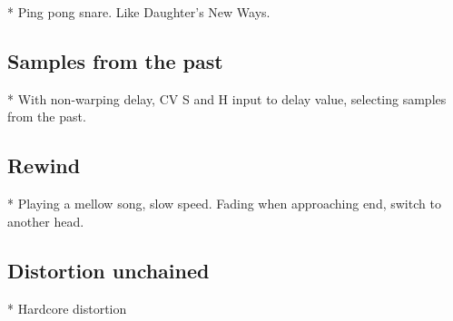 \documentclass[11pt]{article}
\begin{document}
* Ping pong snare. Like Daughter's New Ways.

\subsection{Samples from the past}

* With non-warping delay, CV S and H input to delay value, selecting samples from
  the past.

\subsection{Rewind}

* Playing a mellow song, slow speed. Fading when approaching end, switch to another head.

\subsection{Distortion unchained}

* Hardcore distortion

\newpage
\end{document}
